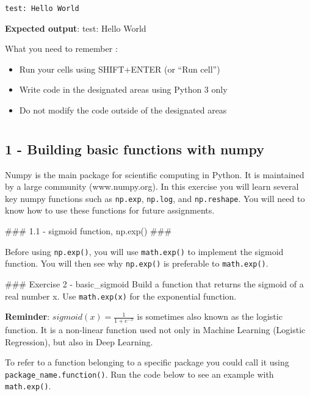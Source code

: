\documentclass[11pt]{article}
\providecommand{\tightlist}{%
      \setlength{\itemsep}{0pt}\setlength{\parskip}{0pt}}
\begin{document}
    \begin{Verbatim}[commandchars=\\\{\}]
test: Hello World
    \end{Verbatim}

    \textbf{Expected output}: test: Hello World

    What you need to remember :

\begin{itemize}
\tightlist
\item
  Run your cells using SHIFT+ENTER (or ``Run cell'')
\item
  Write code in the designated areas using Python 3 only
\item
  Do not modify the code outside of the designated areas
\end{itemize}

    \hypertarget{section}{%
\section{}\label{section}}

\hypertarget{building-basic-functions-with-numpy}{%
\subsection{1 - Building basic functions with
numpy}\label{building-basic-functions-with-numpy}}

Numpy is the main package for scientific computing in Python. It is
maintained by a large community (www.numpy.org). In this exercise you
will learn several key numpy functions such as \texttt{np.exp},
\texttt{np.log}, and \texttt{np.reshape}. You will need to know how to
use these functions for future assignments.

\#\#\# 1.1 - sigmoid function, np.exp() \#\#\#

Before using \texttt{np.exp()}, you will use \texttt{math.exp()} to
implement the sigmoid function. You will then see why \texttt{np.exp()}
is preferable to \texttt{math.exp()}.

\#\#\# Exercise 2 - basic\_sigmoid Build a function that returns the
sigmoid of a real number x. Use \texttt{math.exp(x)} for the exponential
function.

\textbf{Reminder}: \(sigmoid(x) = \frac{1}{1+e^{-x}}\) is sometimes also
known as the logistic function. It is a non-linear function used not
only in Machine Learning (Logistic Regression), but also in Deep
Learning.

To refer to a function belonging to a specific package you could call it
using \texttt{package\_name.function()}. Run the code below to see an
example with \texttt{math.exp()}.
\end{document}
